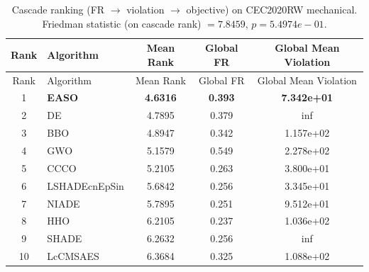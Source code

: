 \begin{center}
\small
\renewcommand{\arraystretch}{1.25}
\begin{longtable}{clccc}
\caption{Cascade ranking (FR $\to$ violation $\to$ objective) on CEC2020RW  mechanical. Friedman statistic (on cascade rank) $=7.8459$, $p=5.4974e-01$.}
\label{tab:cascade_ranking_CEC2020RW_mechanical} \\
\toprule
Rank & Algorithm & Mean Rank & Global FR & Global Mean Violation \\
\midrule
\endfirsthead
\toprule
Rank & Algorithm & Mean Rank & Global FR & Global Mean Violation \\
\midrule
\endhead
1 & \textbf{EASO} & \textbf{4.6316} & \textbf{0.393} & \textbf{7.342e+01} \\
2 & DE & 4.7895 & 0.379 & inf \\
3 & BBO & 4.8947 & 0.342 & 1.157e+02 \\
4 & GWO & 5.1579 & 0.549 & 2.278e+02 \\
5 & CCCO & 5.2105 & 0.263 & 3.800e+01 \\
6 & LSHADEcnEpSin & 5.6842 & 0.256 & 3.345e+01 \\
7 & NIADE & 5.7895 & 0.251 & 9.512e+01 \\
8 & HHO & 6.2105 & 0.237 & 1.036e+02 \\
9 & SHADE & 6.2632 & 0.256 & inf \\
10 & LcCMSAES & 6.3684 & 0.325 & 1.088e+02 \\
\bottomrule
\end{longtable}
\end{center}